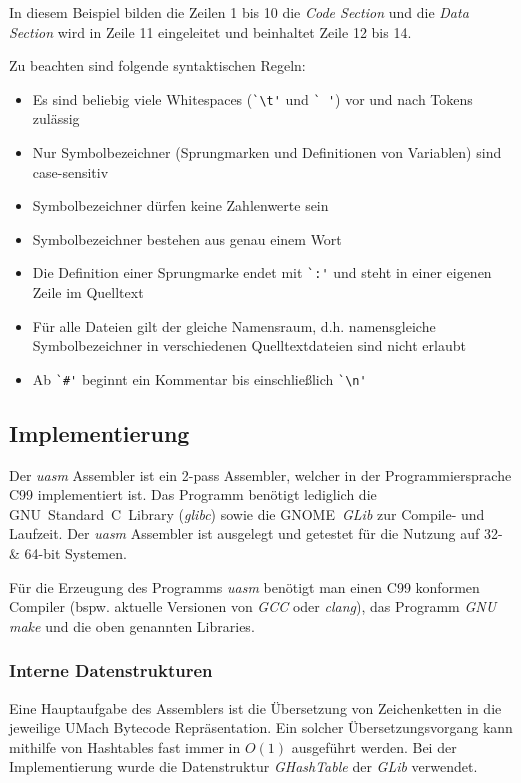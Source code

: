 In diesem Beispiel bilden die Zeilen 1 bis 10 die \emph{Code Section} und die
\emph{Data Section} wird in Zeile 11 eingeleitet und beinhaltet Zeile 12 bis 14.

Zu beachten sind folgende syntaktischen Regeln:
\begin{itemize}
    \item Es sind beliebig viele Whitespaces (\verb#`\t'# und \verb*#` '#) vor
          und nach Tokens zulässig
    \item Nur Symbolbezeichner (Sprungmarken und Definitionen von Variablen)
          sind case-sensitiv
    \item Symbolbezeichner dürfen keine Zahlenwerte sein
    \item Symbolbezeichner bestehen aus genau einem Wort
    \item Die Definition einer Sprungmarke endet mit \verb#`:'# und steht in
          einer eigenen Zeile im Quelltext
    \item Für alle Dateien gilt der gleiche Namensraum, d.h. namensgleiche
          Symbolbezeichner in verschiedenen Quelltextdateien sind nicht erlaubt
    \item Ab \verb|`#'| beginnt ein Kommentar bis einschließlich \verb#`\n'#
\end{itemize}

\subsection{Implementierung}

Der \emph{uasm} Assembler ist ein 2-pass Assembler, welcher in der
Programmiersprache C99 implementiert ist. Das Programm benötigt lediglich
die GNU~Standard~C~Library (\emph{glibc}) sowie die GNOME~\emph{GLib} zur
Compile- und Laufzeit. Der \emph{uasm} Assembler ist ausgelegt und getestet für
die Nutzung auf 32- \& 64-bit Systemen.

Für die Erzeugung des Programms \emph{uasm} benötigt man einen C99 konformen
Compiler (bspw. aktuelle Versionen von \emph{GCC} oder \emph{clang}), das
Programm \emph{GNU make} und die oben genannten Libraries.

\subsubsection{Interne Datenstrukturen}

Eine Hauptaufgabe des Assemblers ist die Übersetzung von Zeichenketten in die
jeweilige UMach Bytecode Repräsentation. Ein solcher Übersetzungsvorgang kann
mithilfe von Hashtables fast immer in $O(1)$ ausgeführt werden. Bei der
Implementierung wurde die Datenstruktur \emph{GHashTable} der \emph{GLib}
verwendet.

